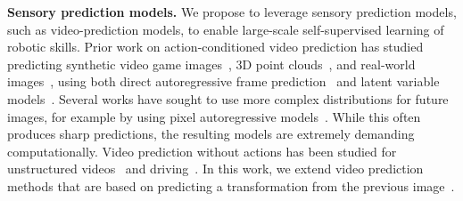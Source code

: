 \noindent \textbf{Sensory prediction models.}
We propose to leverage sensory prediction models, such as video-prediction models, to enable large-scale self-supervised learning of robotic skills. Prior work on action-conditioned video prediction has studied predicting synthetic video game images~\cite{atarioh,recurrentsimulators}, 3D point clouds~\cite{se3}, and real-world images~\cite{bootsetal,finn_nips,video_pixel_networks}, using both direct autoregressive frame prediction~\cite{beyond_mse,finn_nips,video_pixel_networks} and latent variable models~\cite{babaeizadeh2017stochastic,kurutach2018learning}. Several works have sought to use more complex distributions for future images, for example by using pixel autoregressive models~\cite{video_pixel_networks,scott_reed}. 
While this often produces sharp predictions, the resulting models are extremely demanding computationally.
Video prediction without actions has been studied for unstructured videos~\cite{beyond_mse,convlstm,vondrick} and driving~\cite{prednet,dynamic_filter_networks}.  In this work, we extend video prediction methods that are based on predicting a transformation from the previous image~\cite{finn_nips,dynamic_filter_networks}. 
